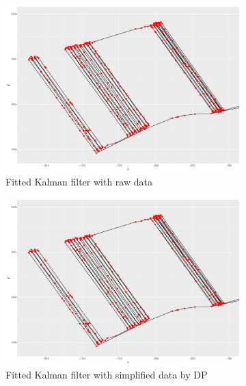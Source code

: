 \begin{figure}[h]
\centering
\begin{subfigure}[t]{0.47\textwidth}
\includegraphics[width=\linewidth]{Chapters/06Spinoff/plot/ggRawKF2.pdf}
\caption{Fitted Kalman filter with raw data}
\end{subfigure}
 \begin{subfigure}[t]{0.47\textwidth}
\includegraphics[width=\linewidth]{Chapters/06Spinoff/plot/ggDPKF2.pdf}
\caption{Fitted Kalman filter with simplified data by DP}
\end{subfigure}
 \begin{subfigure}[t]{0.47\textwidth}

\end{subfigure}
\end{figure}
